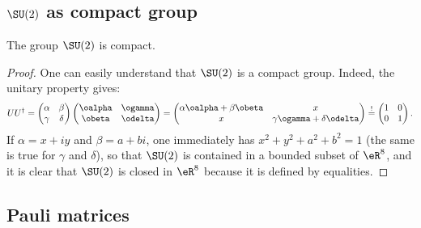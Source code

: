 \subsection{\texorpdfstring{$ \SU(2)$}{SU(2)} as compact group}

\begin{proposition}     \label{PROPooGLPQooKOfrjl}
    The group \( \SU(2)\) is compact.
\end{proposition}

\begin{proof}
    One can easily understand that $\SU(2)$ is a compact group. Indeed, the unitary property gives:
    \[
    UU^{\dag}=
    \begin{pmatrix}
    \alpha & \beta \\
    \gamma & \delta
    \end{pmatrix}
    \begin{pmatrix}
    \oalpha & \ogamma \\
    \obeta & \odelta
    \end{pmatrix}
    =
    \begin{pmatrix}
    \alpha\oalpha+\beta\obeta & x \\
    x & \gamma\ogamma+\delta\odelta
    \end{pmatrix}
    \stackrel{!}{=}
    \begin{pmatrix}
    1  & 0 \\
    0 & 1
    \end{pmatrix}.
    \]
    If $\alpha=x+iy$ and $\beta=a+bi$, one immediately has  $x^2+y^2+a^2+b^2=1$ (the same is true for $\gamma$ and $\delta$), so that $\SU(2)$ is contained in a bounded subset of $\eR^8$, and it is clear that $\SU(2)$ is closed in $\eR^8$ because it is defined by equalities.
\end{proof}

\subsection{Pauli matrices}

